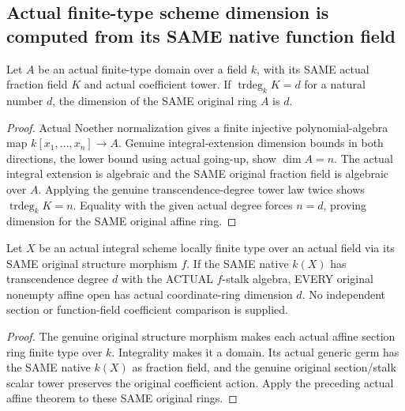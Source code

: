 \subsection{Actual finite-type scheme dimension is computed from its SAME native function field}

\begin{theorem}
\label{scheme:affine-function-field-dimension}
\leanok
Let $A$ be an actual finite-type domain over a field $k$, with its SAME
actual fraction field $K$ and actual coefficient tower. If
$\operatorname{trdeg}_k K=d$ for a natural number $d$, the dimension of the
SAME original ring $A$ is $d$.
\end{theorem}
\begin{proof}
Actual Noether normalization gives a finite injective polynomial-algebra
map $k[x_1,\ldots,x_n]\to A$. Genuine integral-extension dimension bounds
in both directions, the lower bound using actual going-up, show
$\dim A=n$. The actual integral extension is algebraic and the SAME
original fraction field is algebraic over $A$. Applying the genuine
transcendence-degree tower law twice shows
$\operatorname{trdeg}_k K=n$. Equality with the given actual degree forces
$n=d$, proving dimension for the SAME original affine ring.
\end{proof}

\begin{theorem}
\label{scheme:actual-affine-sections-function-field-dimension}
\leanok
{}
Let $X$ be an actual integral scheme locally finite type over an actual
field via its SAME original structure morphism $f$. If the SAME native
$k(X)$ has transcendence degree $d$ with the ACTUAL $f$-stalk algebra,
EVERY original nonempty affine open has actual coordinate-ring dimension $d$.
No independent section or function-field coefficient comparison is supplied.
\end{theorem}
\begin{proof}
The genuine original structure morphism makes each actual affine section
ring finite type over $k$. Integrality makes it a domain. Its actual generic
germ has the SAME native $k(X)$ as fraction field, and the genuine original
section/stalk scalar tower preserves the original coefficient action.
Apply the preceding actual affine theorem to these SAME original rings.
\end{proof}

